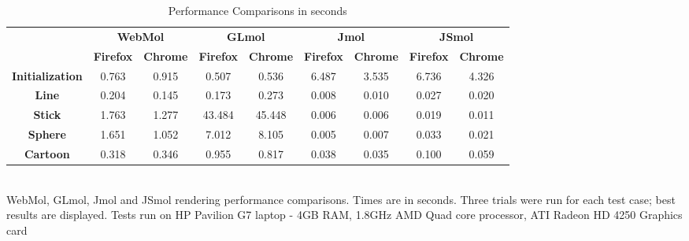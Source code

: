 \documentclass[]{article}
\begin{document}
\begin{table}[h]
\caption{Performance Comparisons in seconds}
\begin{tabular}{ccccccccc}
\multicolumn{1}{l}{}    & \multicolumn{2}{c}{\textbf{WebMol}}                        & \multicolumn{2}{c}{\textbf{GLmol}}                           & \multicolumn{2}{c}{\textbf{Jmol}}                          & \multicolumn{2}{c}{\textbf{JSmol}}              \\
\multicolumn{1}{l}{}    & \textbf{Firefox}              & \textbf{Chrome}            & \textbf{Firefox}               & \textbf{Chrome}             & \textbf{Firefox}              & \textbf{Chrome}            & \textbf{Firefox}              & \textbf{Chrome} \\
\textbf{Initialization} & \cellcolor[HTML]{C0C0C0}0.763 & \multicolumn{1}{c|}{0.915} & \cellcolor[HTML]{C0C0C0}0.507  & \multicolumn{1}{c|}{0.536}  & \cellcolor[HTML]{C0C0C0}6.487 & \multicolumn{1}{c|}{3.535} & \cellcolor[HTML]{C0C0C0}6.736 & 4.326           \\
\textbf{Line}           & \cellcolor[HTML]{C0C0C0}0.204 & \multicolumn{1}{c|}{0.145} & \cellcolor[HTML]{C0C0C0}0.173  & \multicolumn{1}{c|}{0.273}  & \cellcolor[HTML]{C0C0C0}0.008 & \multicolumn{1}{c|}{0.010} & \cellcolor[HTML]{C0C0C0}0.027 & 0.020           \\
\textbf{Stick}          & \cellcolor[HTML]{C0C0C0}1.763 & \multicolumn{1}{c|}{1.277} & \cellcolor[HTML]{C0C0C0}43.484 & \multicolumn{1}{c|}{45.448} & \cellcolor[HTML]{C0C0C0}0.006 & \multicolumn{1}{c|}{0.006} & \cellcolor[HTML]{C0C0C0}0.019 & 0.011           \\
\textbf{Sphere}         & \cellcolor[HTML]{C0C0C0}1.651 & \multicolumn{1}{c|}{1.052} & \cellcolor[HTML]{C0C0C0}7.012  & \multicolumn{1}{c|}{8.105}  & \cellcolor[HTML]{C0C0C0}0.005 & \multicolumn{1}{c|}{0.007} & \cellcolor[HTML]{C0C0C0}0.033 & 0.021           \\
\textbf{Cartoon}        & \cellcolor[HTML]{C0C0C0}0.318 & \multicolumn{1}{c|}{0.346} & \cellcolor[HTML]{C0C0C0}0.955  & \multicolumn{1}{c|}{0.817}  & \cellcolor[HTML]{C0C0C0}0.038 & \multicolumn{1}{c|}{0.035} & \cellcolor[HTML]{C0C0C0}0.100 & 0.059          
\end{tabular}
\\[1.5pt]
WebMol, GLmol, Jmol and JSmol rendering performance comparisons.  Times are in seconds.  Three trials were run for each test case; best results are displayed.  Tests run on HP Pavilion G7 laptop - 4GB RAM, 1.8GHz AMD Quad core processor, ATI Radeon HD 4250 Graphics card
\label{my-label}
\end{table}
\end{document}
